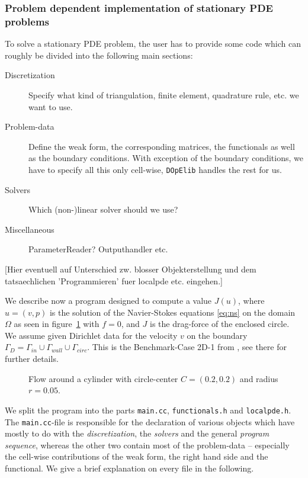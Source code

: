 \documentclass[prodmode,acmtoms]{acmsmall}
\numberwithin{equation}{section}
\newcommand{\dope}{\texttt{DOpElib}}
\newcommand{\mymarginpar}[1]{\marginpar{\textcolor{red}{\normalsize{#1}}}}
\begin{document}
\subsubsection{Problem dependent implementation of stationary PDE problems}
To solve a stationary PDE problem, the user has to provide some code which can roughly be divided into the following main sections:
\begin{description}
\item[Discretization] Specify what kind of triangulation, finite element, quadrature rule, etc. we want to use.
\item[Problem-data] Define the weak form, the corresponding matrices, the functionals as well as the boundary conditions. With exception of the boundary conditions, we have to specify all this only cell-wise, \dope{} handles the rest for us.
\item[Solvers] Which (non-)linear solver should we use? 
\mymarginpar{besser algorithmen?}
\item[Miscellaneous] ParameterReader? Outputhandler etc.
\end{description} 
[Hier eventuell auf Unterschied zw. blosser Objekterstellung und dem tatsaechlichen 'Programmieren' fuer localpde etc. eingehen.]

We describe now a program designed to compute a value $J(u)$, where $u=(v,p)$ is the solution of the Navier-Stokes equations \eqref{eq:ns} on the domain $\Omega$ as seen in figure~\ref{fig:example_ns} with  $f=0$, and $J$ is the drag-force of the enclosed circle. We assume given Dirichlet data for the velocity $v$ on the boundary $\Gamma_{D}=\Gamma_{in}\cup\Gamma_{wall}\cup\Gamma_{circ}$. This is the Benchmark-Case 2D-1 from \cite{TuSchae96}, see there for further details.
\begin{figure}[h]
\centering
\resizebox{0.5\textwidth}{!}{}
\caption{Flow around a cylinder with 
circle-center $C=(0.2,0.2)$ and radius $r=0.05$.}
\label{fig:example_ns}
\end{figure}

We split the program into the parts \texttt{main.cc}, \texttt{functionals.h} and \texttt{localpde.h}. The \texttt{main.cc}-file is responsible for the declaration of various objects which have mostly to do with the \textit{discretization}, the \textit{solvers} and the general \textit{program sequence}, whereas the other two contain most of the problem-data -- especially the cell-wise contributions of the weak form, the right hand side and the functional. We give a brief explanation on every file in the following.
\end{document}
